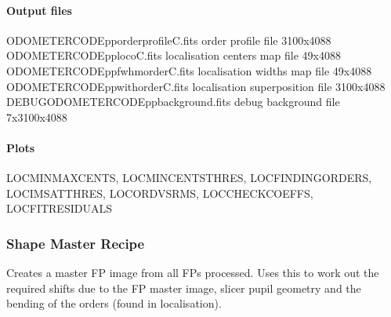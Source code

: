 \documentclass[a4paper,10pt,english]{report}
\begin{document}
\paragraph{Output files}
\label{\detokenize{user/spirou/recipes/localisation:output-files}}
\begin{sphinxVerbatim}[commandchars=\\\{\}]
ODOMETER\PYGZus{}CODE\PYGZus{}pp\PYGZus{}order\PYGZus{}profile\PYGZus{}C.fits   order profile file 3100x4088
ODOMETER\PYGZus{}CODE\PYGZus{}pp\PYGZus{}loco\PYGZus{}C.fits            localisation centers map file 49x4088
ODOMETER\PYGZus{}CODE\PYGZus{}pp\PYGZus{}fwhm\PYGZhy{}order\PYGZus{}C.fits      localisation widths map file 49x4088
ODOMETER\PYGZus{}CODE\PYGZus{}pp\PYGZus{}with\PYGZhy{}order\PYGZus{}C.fits      localisation superposition file 3100x4088
DEBUG\PYGZus{}ODOMETER\PYGZus{}CODE\PYGZus{}pp\PYGZus{}background.fits  debug background file 7x3100x4088
\end{sphinxVerbatim}


\paragraph{Plots}
\label{\detokenize{user/spirou/recipes/localisation:plots}}
\begin{sphinxVerbatim}[commandchars=\\\{\}]
LOC\PYGZus{}MINMAX\PYGZus{}CENTS, LOC\PYGZus{}MIN\PYGZus{}CENTS\PYGZus{}THRES, LOC\PYGZus{}FINDING\PYGZus{}ORDERS, LOC\PYGZus{}IM\PYGZus{}SAT\PYGZus{}THRES,
LOC\PYGZus{}ORD\PYGZus{}VS\PYGZus{}RMS, LOC\PYGZus{}CHECK\PYGZus{}COEFFS, LOC\PYGZus{}FIT\PYGZus{}RESIDUALS
\end{sphinxVerbatim}


\subsubsection{Shape Master Recipe}
\label{\detokenize{user/spirou/recipes/shape_master:shape-master-recipe}}\label{\detokenize{user/spirou/recipes/shape_master:recipes-spirou-shape-master}}\label{\detokenize{user/spirou/recipes/shape_master::doc}}
Creates a master FP image from all FPs processed. Uses this to work out the
required shifts due to the FP master image, slicer pupil geometry and the
bending of the orders (found in localisation).
\end{document}
